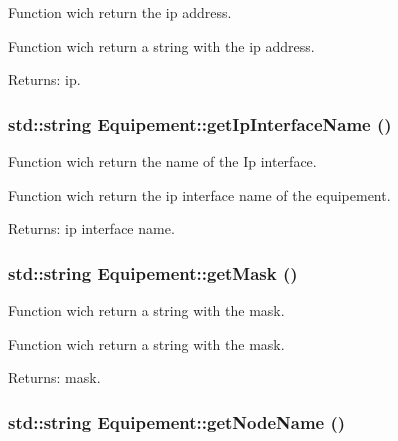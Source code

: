 Function wich return the ip address. 

Function wich return a string with the ip address.

\begin{Desc}
\item[Returns:]ip. \end{Desc}
\hypertarget{class_equipement_a603e0547ea7c1b7f10757226100e1cc}{
\subsubsection[{getIpInterfaceName}]{\setlength{\rightskip}{0pt plus 5cm}std::string Equipement::getIpInterfaceName ()}}
\label{class_equipement_a603e0547ea7c1b7f10757226100e1cc}


Function wich return the name of the Ip interface. 

Function wich return the ip interface name of the equipement.

\begin{Desc}
\item[Returns:]ip interface name. \end{Desc}
\hypertarget{class_equipement_fd9a9ce18e78c3540a0cb6d633def3d3}{
\subsubsection[{getMask}]{\setlength{\rightskip}{0pt plus 5cm}std::string Equipement::getMask ()}}
\label{class_equipement_fd9a9ce18e78c3540a0cb6d633def3d3}


Function wich return a string with the mask. 

Function wich return a string with the mask.

\begin{Desc}
\item[Returns:]mask. \end{Desc}
\hypertarget{class_equipement_4ab70e59e11de8b7f8af99d06409b032}{
\subsubsection[{getNodeName}]{\setlength{\rightskip}{0pt plus 5cm}std::string Equipement::getNodeName ()}}
\label{class_equipement_4ab70e59e11de8b7f8af99d06409b032}



